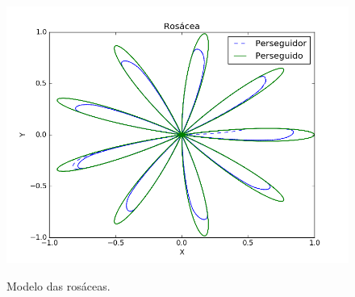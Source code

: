 \documentclass[a4paper,10pt]{article}
\begin{document}
  \begin{figure}[H]
   \includegraphics[width=\textwidth]{rosacea.png}
   \label{fig:rosacea}
   \caption{Modelo das rosáceas.}
  \end{figure}
  
\end{document}
